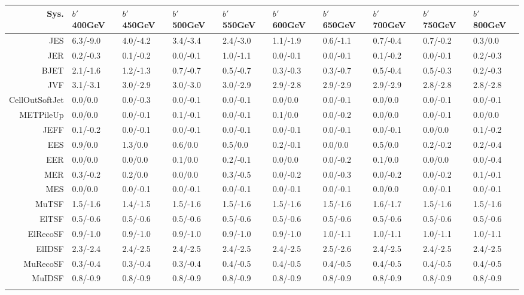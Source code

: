 \begin{tabular}{r|p{.08\linewidth}p{.08\linewidth}p{.08\linewidth}p{.08\linewidth}p{.08\linewidth}p{.08\linewidth}p{.08\linewidth}p{.08\linewidth}p{.08\linewidth}}
\toprule
 Sys.  & $b'$ 400GeV & $b'$ 450GeV & $b'$ 500GeV & $b'$ 550GeV & $b'$ 600GeV & $b'$ 650GeV & $b'$ 700GeV & $b'$ 750GeV & $b'$ 800GeV \\
\toprule
JES  & 6.3/-9.0 & 4.0/-4.2 & 3.4/-3.4 & 2.4/-3.0 & 1.1/-1.9 & 0.6/-1.1 & 0.7/-0.4 & 0.7/-0.2 & 0.3/0.0 \\
JER  & 0.2/-0.3 & 0.1/-0.2 & 0.0/-0.1 & 1.0/-1.1 & 0.0/-0.1 & 0.0/-0.1 & 0.1/-0.2 & 0.0/-0.1 & 0.2/-0.3 \\
BJET  & 2.1/-1.6 & 1.2/-1.3 & 0.7/-0.7 & 0.5/-0.7 & 0.3/-0.3 & 0.3/-0.7 & 0.5/-0.4 & 0.5/-0.3 & 0.2/-0.3 \\
JVF  & 3.1/-3.1 & 3.0/-2.9 & 3.0/-3.0 & 3.0/-2.9 & 2.9/-2.8 & 2.9/-2.9 & 2.9/-2.9 & 2.8/-2.8 & 2.8/-2.8 \\
CellOutSoftJet  & 0.0/0.0 & 0.0/-0.3 & 0.0/-0.1 & 0.0/-0.1 & 0.0/0.0 & 0.0/-0.1 & 0.0/0.0 & 0.0/-0.1 & 0.0/-0.1 \\
METPileUp  & 0.0/0.0 & 0.0/-0.1 & 0.1/-0.1 & 0.0/-0.1 & 0.1/0.0 & 0.0/-0.2 & 0.0/0.0 & 0.0/-0.1 & 0.0/0.0 \\
JEFF  & 0.1/-0.2 & 0.0/-0.1 & 0.0/-0.1 & 0.0/-0.1 & 0.0/-0.1 & 0.0/-0.1 & 0.0/-0.1 & 0.0/0.0 & 0.1/-0.2 \\
EES  & 0.9/0.0 & 1.3/0.0 & 0.6/0.0 & 0.5/0.0 & 0.2/-0.1 & 0.0/0.0 & 0.5/0.0 & 0.2/-0.2 & 0.2/-0.4 \\
EER  & 0.0/0.0 & 0.0/0.0 & 0.1/0.0 & 0.2/-0.1 & 0.0/0.0 & 0.0/-0.2 & 0.1/0.0 & 0.0/0.0 & 0.0/-0.4 \\
MER  & 0.3/-0.2 & 0.2/0.0 & 0.0/0.0 & 0.3/-0.5 & 0.0/-0.2 & 0.0/-0.3 & 0.0/-0.2 & 0.0/-0.2 & 0.1/-0.1 \\
MES  & 0.0/0.0 & 0.0/-0.1 & 0.0/-0.1 & 0.0/-0.1 & 0.0/-0.1 & 0.0/-0.1 & 0.0/0.0 & 0.0/-0.1 & 0.0/-0.1 \\
MuTSF  & 1.5/-1.6 & 1.4/-1.5 & 1.5/-1.6 & 1.5/-1.6 & 1.5/-1.6 & 1.5/-1.6 & 1.6/-1.7 & 1.5/-1.6 & 1.5/-1.6 \\
ElTSF  & 0.5/-0.6 & 0.5/-0.6 & 0.5/-0.6 & 0.5/-0.6 & 0.5/-0.6 & 0.5/-0.6 & 0.5/-0.6 & 0.5/-0.6 & 0.5/-0.6 \\
ElRecoSF  & 0.9/-1.0 & 0.9/-1.0 & 0.9/-1.0 & 0.9/-1.0 & 0.9/-1.0 & 1.0/-1.1 & 1.0/-1.1 & 1.0/-1.1 & 1.0/-1.1 \\
ElIDSF  & 2.3/-2.4 & 2.4/-2.5 & 2.4/-2.5 & 2.4/-2.5 & 2.4/-2.5 & 2.5/-2.6 & 2.4/-2.5 & 2.4/-2.5 & 2.4/-2.5 \\
MuRecoSF  & 0.3/-0.4 & 0.3/-0.4 & 0.3/-0.4 & 0.4/-0.5 & 0.4/-0.5 & 0.4/-0.5 & 0.4/-0.5 & 0.4/-0.5 & 0.4/-0.5 \\
MuIDSF  & 0.8/-0.9 & 0.8/-0.9 & 0.8/-0.9 & 0.8/-0.9 & 0.8/-0.9 & 0.8/-0.9 & 0.8/-0.9 & 0.8/-0.9 & 0.8/-0.9 \\
 \\
\bottomrule
\end{tabular}
